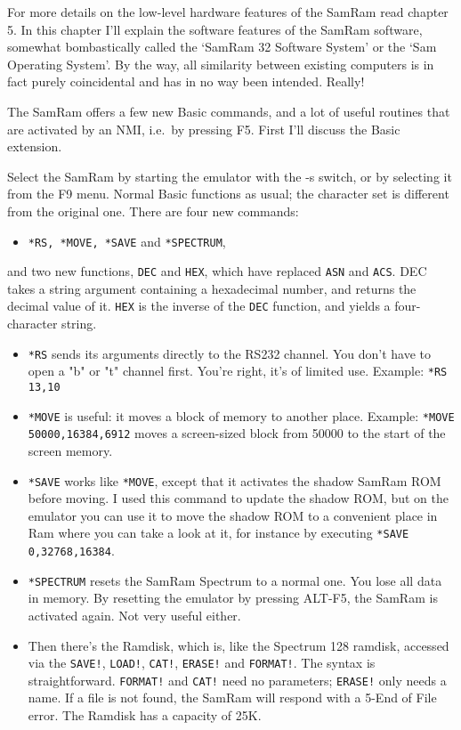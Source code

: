     For more details on the low-level hardware features of the SamRam read
    chapter 5.  In this chapter I'll explain the software features of the
    SamRam software, somewhat bombastically called the `SamRam 32 Software
    System' or the `Sam Operating System'.  By the way, all similarity
    between existing computers is in fact purely coincidental and has in no
    way been intended.  Really!

    The SamRam offers a few new Basic commands, and a lot of useful routines
    that are activated by an NMI, i.e.\ by pressing F5.  First I'll discuss
    the Basic extension.

    Select the SamRam by starting the emulator with the -s switch, or by
    selecting it from the F9 menu.  Normal Basic functions as usual; the
    character set is different from the original one.  There are four new
    commands: 
\begin{itemize}
  \item[] \verb|*RS, *MOVE, *SAVE| and \verb|*SPECTRUM|,
\end{itemize}
    and two new functions, \verb|DEC| and \verb|HEX|, which have replaced
    \verb|ASN| and \verb|ACS|\@.  DEC takes a string argument
    containing a hexadecimal number, and returns the decimal value of it.
    \verb|HEX| is the inverse of the \verb|DEC| function, and yields a
    four-character string.
\begin{itemize}
  \item
    \verb|*RS| sends its arguments directly to the RS232 channel.
    You don't have
    to open a "b" or "t" channel first.  You're right, it's of limited use.
    Example: \verb|*RS 13,10|
  \item
    \verb|*MOVE| is useful: it moves a block of memory to another place.
    Example: \verb|*MOVE 50000,16384,6912| moves a screen-sized block from
    50000 to the start of the screen memory.
  \item
    \verb|*SAVE| works like \verb|*MOVE|, except that it activates the shadow
    SamRam ROM
    before moving.  I used this command to update the shadow ROM, but on the
    emulator you can use it to move the shadow ROM to a convenient place in
    Ram where you can take a look at it, for instance by executing
    \verb|*SAVE 0,32768,16384|.
  \item  
    \verb|*SPECTRUM| resets the SamRam Spectrum to a normal one.  You lose
    all data
    in memory.  By resetting the emulator by pressing ALT-F5, the SamRam is
    activated again.  Not very useful either.
  \item
    Then there's the Ramdisk, which is, like the Spectrum 128 ramdisk,
    accessed via the \verb|SAVE!|, \verb|LOAD!|, \verb|CAT!|, \verb|ERASE!|
    and \verb|FORMAT!|.  The syntax is
    straightforward.  \verb|FORMAT!| and \verb|CAT!| need no parameters;
    \verb|ERASE!| only needs
    a name.  If a file is not found, the SamRam will respond with a 5-End of
    File error.  The Ramdisk has a capacity of 25K.
\end{itemize}


